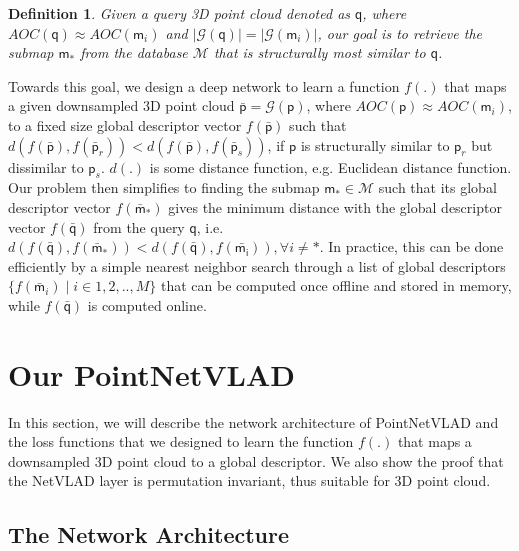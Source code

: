 \documentclass[10pt,twocolumn,letterpaper]{article}
\newtheorem{definition}{Definition}
\begin{document}
\begin{definition}
Given a query 3D point cloud denoted as $\mathsf{q}$, where  $AOC(\mathsf{q}) \approx AOC(\mathsf{m}_i)$ and $|\mathcal{G}(\mathsf{q})| = |\mathcal{G}(\mathsf{m}_i)|$, our goal is to retrieve
the submap $\mathsf{m}_{*}$ from the database $\mathcal{M}$ that is structurally most similar to $\mathsf{q}$. 

\end{definition}

Towards this goal, we design a deep network to learn a function $f(.)$ that maps a given downsampled 3D point cloud $\bar{\mathsf{p}}={\mathcal{G}(\mathsf{p})}$, where $AOC(\mathsf{p}) \approx AOC(\mathsf{m}_i)$, to a fixed size global descriptor vector $f(\bar{\mathsf{p}})$ such that $d(f(\bar{\mathsf{p}}),f(\bar{\mathsf{p}}_r)) < d(f(\bar{\mathsf{p}}),f(\bar{\mathsf{p}}_s))$, if $\mathsf{p}$ is structurally similar to $\mathsf{p}_r$ but dissimilar to $\mathsf{p}_s$. $d(.)$ is some distance function, e.g. Euclidean distance function. Our problem then simplifies to finding the submap $\mathsf{m}_* \in \mathcal{M}$ such that its global descriptor vector $f(\bar{\mathsf{m}}_*)$ gives the minimum distance with the global descriptor vector $f(\bar{\mathsf{q}})$ from the query $\mathsf{q}$, i.e. $d(f(\bar{\mathsf{q}}),f(\bar{\mathsf{m}}_*)) < d(f(\bar{\mathsf{q}}),f(\bar{\mathsf{m_i}})), \forall i \neq *$. In practice, this can be done efficiently by a simple nearest neighbor search through a list of global descriptors $\{f(\bar{\mathsf{m}}_i) \mid i\in1,2,..,M\}$ that can be computed once offline and stored in memory, while  $f(\bar{\mathsf{q}})$ is computed online. 



 	\section{Our PointNetVLAD}

In this section, we will describe the network architecture of PointNetVLAD and the loss functions that we designed to learn the function 
$f(.)$ that maps a downsampled 3D point cloud to a global descriptor. We also show the proof that the NetVLAD layer is permutation invariant, thus suitable for 3D point cloud. 
 
\subsection{The Network Architecture}
\end{document}
